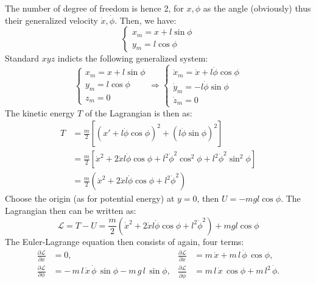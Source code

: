 The number of degree of freedom is hence 2, for $x,\phi$ as the angle (obviously) thus their generalized velocity $\dot{x},\dot{\phi}$. Then, we have: 
\begin{equation}
    \begin{cases}
        x_{m} = x + l\sin{\phi}\\
        y_{m} = l\cos{\phi}
    \end{cases}
\end{equation}
Standard $xyz$ indicts the following generalized system: 
\begin{equation}
    \begin{cases}
        x_{m} = x + l\sin{\phi}\\
        y_{m} = l\cos{\phi}\\
        z_{m} = 0
    \end{cases}
    \Rightarrow \begin{cases}
        \dot{x}_{m} = \dot{x} + l \dot{\phi} \cos{\phi}\\
        \dot{y}_{m} = -l \dot{\phi}\sin{\phi}\\
        \dot{z}_{m} = 0
    \end{cases}
\end{equation}
The kinetic energy $T$ of the Lagrangian is then as: 
\begin{equation}
    \begin{split}
        T 
        & = \frac{m}{2} \left[ (x'+l \dot{\phi}\cos{\phi})^{2} + (l\dot{\phi}\sin{\phi})^{2} \right]\\
        & = \frac{m}{2} \left[ \dot{x}^{2} + 2\dot{x} l\dot{\phi}\cos{\phi} + l^{2}\dot{\phi}^{2}\cos^{2}{\phi} + l^{2}\dot{\phi}^{2}\sin^{2}{\phi} \right]\\
        & = \frac{m}{2} \left( \dot{x}^{2} + 2\dot{x}l \dot{\phi}\cos{\phi} + l^{2} \dot{\phi}^{2} \right)
    \end{split}
\end{equation}
Choose the origin (as for potential energy) at $y=0$, then $U=-mgl \cos{\phi}$. The Lagrangian then can be written as: 
\begin{equation}
    \mathcal{L} = T - U = \frac{m}{2} \left( \dot{x}^{2} + 2\dot{x}l \dot{\phi}\cos{\phi} + l^{2} \dot{\phi}^{2} \right) + mgl \cos{\phi}
\end{equation}
The Euler-Lagrange equation then consists of again, four terms: 
\begin{equation}
\begin{aligned}
\frac{\partial \mathcal{L}}{\partial x}
  &= 0, 
&
\frac{\partial \mathcal{L}}{\partial \dot{x}}
  &= m\,\dot{x} + m\,l\,\dot{\phi}\,\cos\phi,\\
\frac{\partial \mathcal{L}}{\partial \phi}
  &= -\,m\,l\,\dot{x}\,\dot{\phi}\,\sin\phi
     - m\,g\,l\,\sin\phi,
&
\frac{\partial \mathcal{L}}{\partial \dot{\phi}}
  &= m\,l\,\dot{x}\,\cos\phi
     + m\,l^{2}\,\dot{\phi}.
\end{aligned}
\end{equation}

